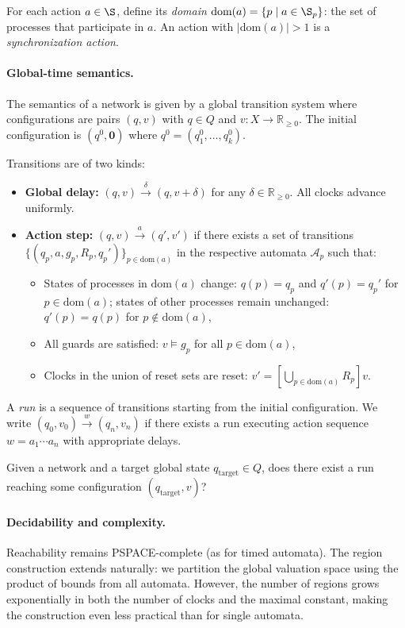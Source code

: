 For each action $a \in \S$, define its \emph{domain} $\text{dom}(a) = \{p \mid a \in \S_p\}$: the set of processes that participate in $a$. An action with $|\text{dom}(a)| > 1$ is a \emph{synchronization action}.

\paragraph{Global-time semantics.} The semantics of a network is given by a global transition system where configurations are pairs $(q, v)$ with $q \in Q$ and $v : X \to \mathbb{R}_{\geq 0}$. The initial configuration is $(q^0, \mathbf{0})$ where $q^0 = (q_1^0, \ldots, q_k^0)$.

Transitions are of two kinds:
\begin{itemize}
\item \textbf{Global delay:} $(q, v) \xrightarrow{\delta} (q, v + \delta)$ for any $\delta \in \mathbb{R}_{\geq 0}$. All clocks advance uniformly.
\item \textbf{Action step:} $(q, v) \xrightarrow{a} (q', v')$ if there exists a set of transitions $\{(q_p, a, g_p, R_p, q_p')\}_{p \in \text{dom}(a)}$ in the respective automata $\mathcal{A}_p$ such that:
\begin{itemize}
\item States of processes in $\text{dom}(a)$ change: $q(p) = q_p$ and $q'(p) = q_p'$ for $p \in \text{dom}(a)$; states of other processes remain unchanged: $q'(p) = q(p)$ for $p \notin \text{dom}(a)$,
\item All guards are satisfied: $v \models g_p$ for all $p \in \text{dom}(a)$,
\item Clocks in the union of reset sets are reset: $v' = [\bigcup_{p \in \text{dom}(a)} R_p] v$.
\end{itemize}
\end{itemize}

A \emph{run} is a sequence of transitions starting from the initial configuration. We write $(q_0, v_0) \xrightarrow{w} (q_n, v_n)$ if there exists a run executing action sequence $w = a_1 \cdots a_n$ with appropriate delays.

\begin{definition}
Given a network and a target global state $q_{\text{target}} \in Q$, does there exist a run reaching some configuration $(q_{\text{target}}, v)$?
\end{definition}

\paragraph{Decidability and complexity.} Reachability remains PSPACE-complete (as for timed automata). The region construction extends naturally: we partition the global valuation space using the product of bounds from all automata. However, the number of regions grows exponentially in both the number of clocks and the maximal constant, making the construction even less practical than for single automata.

